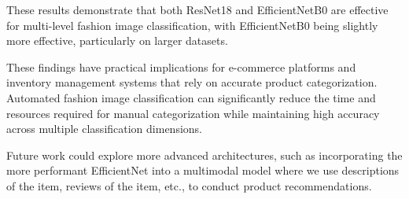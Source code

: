 \documentclass[10pt,journal,compsoc]{IEEEtran}
\begin{document}
These results demonstrate that both ResNet18 and EfficientNetB0 are effective for multi-level fashion image classification, with EfficientNetB0 being slightly more effective, particularly on larger datasets.

These findings have practical implications for e-commerce platforms and inventory management systems that rely on accurate product categorization. Automated fashion image classification can significantly reduce the time and resources required for manual categorization while maintaining high accuracy across multiple classification dimensions.

Future work could explore more advanced architectures, such as incorporating the more performant EfficientNet into a multimodal model where we use descriptions of the item, reviews of the item, etc., to conduct product recommendations.
\end{document}
